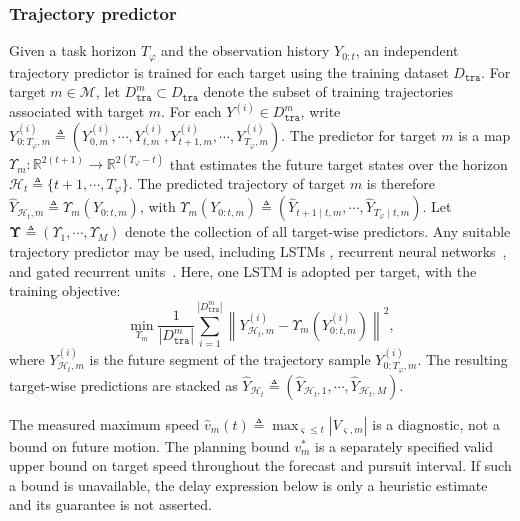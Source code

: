 \subsubsection{Trajectory predictor}
\label{ch06:subsec:traj-predictor}

Given a task horizon $T_{\varphi}$ and the observation history
$Y_{0:t}$, an independent trajectory predictor is trained for each
target using the training dataset $D_{\texttt{tra}}$. For target
$m \in \mathcal{M}$, let
$D_{\texttt{tra}}^m \subset D_{\texttt{tra}}$ denote the subset of
training trajectories associated with target $m$. For each
$Y^{(i)} \in D_{\texttt{tra}}^m$, write
$Y_{0:T_{\varphi},m}^{(i)} \triangleq
(Y_{0,m}^{(i)},\cdots,Y_{t,m}^{(i)},Y_{t+1,m}^{(i)},\cdots,
Y_{T_{\varphi},m}^{(i)})$.
The predictor for target $m$ is a map
$\Upsilon_m : \mathbb{R}^{2(t+1)} \rightarrow
\mathbb{R}^{2(T_{\varphi}-t)}$ that estimates the future target states
over the horizon
$\mathcal{H}_t \triangleq \{t+1,\cdots,T_{\varphi}\}$. The predicted
trajectory of target $m$ is therefore
$\widehat{Y}_{\mathcal{H}_t,m} \triangleq \Upsilon_m(Y_{0:t,m})$,
with
$\Upsilon_m(Y_{0:t,m}) \triangleq
(\widehat{Y}_{t+1 \mid t,m},\cdots,\widehat{Y}_{T_{\varphi} \mid t,m})$.
Let
$\mathbf{\Upsilon} \triangleq (\Upsilon_1,\cdots,\Upsilon_M)$ denote the
collection of all target-wise predictors.
Any suitable trajectory predictor may be used, including LSTMs
\citep{Hochreiter1997LSTM}, recurrent neural networks~\citep{rnn}, and gated
recurrent units~\citep{gru}. Here, one LSTM is adopted per target, with the
training objective:
\begin{equation}
\label{ch06:eq:traj-loss}
\min_{\Upsilon_m}
\frac{1}{|D_{\texttt{tra}}^m|}
\sum_{i=1}^{|D_{\texttt{tra}}^m|}
\left\|
Y_{\mathcal{H}_t,m}^{(i)} -
\Upsilon_m(Y_{0:t,m}^{(i)})
\right\|^2,
\end{equation}
where $Y_{\mathcal{H}_t,m}^{(i)}$ is the future segment of the
trajectory sample $Y_{0:T_{\varphi},m}^{(i)}$. The resulting
target-wise predictions are stacked as
$\widehat{Y}_{\mathcal{H}_t} \triangleq
(\widehat{Y}_{\mathcal{H}_t,1},\cdots,\widehat{Y}_{\mathcal{H}_t,M})$.
\begin{revision}
The measured maximum speed
$\widehat v_m(t)\triangleq\max_{\varsigma\le t}|V_{\varsigma,m}|$
is a diagnostic, not a bound on future motion. The planning bound
$v_m^\ast$ is a separately specified valid upper bound on target speed
throughout the forecast and pursuit interval. If such a bound is unavailable,
the delay expression below is only a heuristic estimate and its guarantee
is not asserted.
\end{revision}


